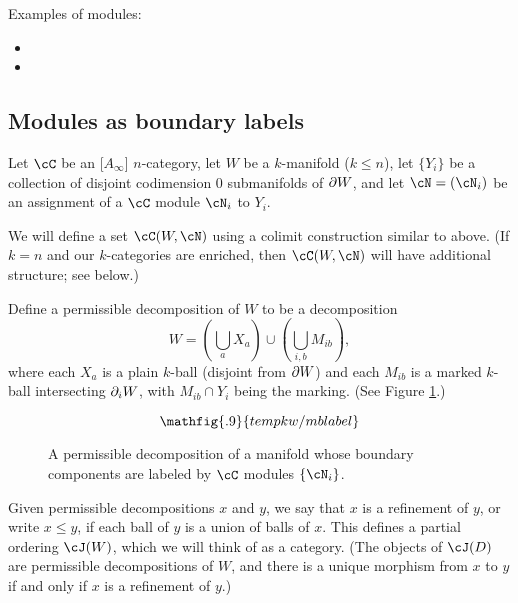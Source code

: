 \medskip

Examples of modules:
\begin{itemize}
\item {}
\item {}
\end{itemize}

\subsection{Modules as boundary labels}
\label{moddecss}

Let $\cC$ be an [$A_\infty$] $n$-category, let $W$ be a $k$-manifold ($k\le n$),
let $\{Y_i\}$ be a collection of disjoint codimension 0 submanifolds of $\partial W$,
and let $\cN = (\cN_i)$ be an assignment of a $\cC$ module $\cN_i$ to $Y_i$.


We will define a set $\cC(W, \cN)$ using a colimit construction similar to above.
(If $k = n$ and our $k$-categories are enriched, then
$\cC(W, \cN)$ will have additional structure; see below.)

Define a permissible decomposition of $W$ to be a decomposition
\[
	W = (\bigcup_a X_a) \cup (\bigcup_{i,b} M_{ib}) ,
\]
where each $X_a$ is a plain $k$-ball (disjoint from $\partial W$) and
each $M_{ib}$ is a marked $k$-ball intersecting $\partial_i W$,
with $M_{ib}\cap Y_i$ being the marking.
(See Figure \ref{mblabel}.)
\begin{figure}[!ht]\begin{equation*}
\mathfig{.9}{tempkw/mblabel}
\end{equation*}\caption{A permissible decomposition of a manifold
whose boundary components are labeled by $\cC$ modules $\{\cN_i\}$.}\label{mblabel}\end{figure}
Given permissible decompositions $x$ and $y$, we say that $x$ is a refinement
of $y$, or write $x \le y$, if each ball of $y$ is a union of balls of $x$.
This defines a partial ordering $\cJ(W)$, which we will think of as a category.
(The objects of $\cJ(D)$ are permissible decompositions of $W$, and there is a unique
morphism from $x$ to $y$ if and only if $x$ is a refinement of $y$.)

